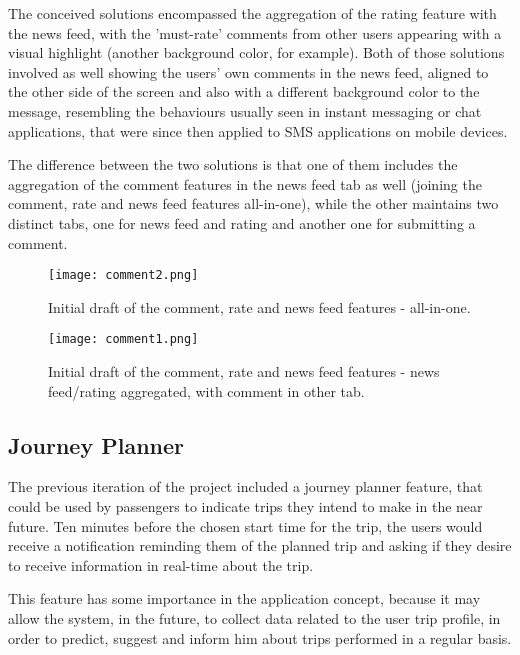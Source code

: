 The conceived solutions encompassed the aggregation of the rating feature with the news feed, with the 'must-rate' comments from other users appearing with a visual highlight (another background color, for example).
Both of those solutions involved as well showing the users' own comments in the news feed, aligned to the other side of the screen and also with a different background color to the message, resembling the behaviours usually seen in instant messaging or chat applications, that were since then applied to SMS applications on mobile devices.

The difference between the two solutions is that one of them includes the aggregation of the comment features in the news feed tab as well (joining the comment, rate and news feed features all-in-one), while the other maintains two distinct tabs, one for news feed and rating and another one for submitting a comment.

\begin{figure}[h!]
  \begin{center}
    \leavevmode
    \texttt{[image: comment2.png]}
    \caption{Initial draft of the comment, rate and news feed features - all-in-one.}
    \label{fig:comment2}
  \end{center}
\end{figure}

\begin{figure}[h!]
  \begin{center}
    \leavevmode
    \texttt{[image: comment1.png]}
    \caption{Initial draft of the comment, rate and news feed features - news feed/rating aggregated, with comment in other tab.}
    \label{fig:comment1}
  \end{center}
\end{figure}

\subsection{Journey Planner}

The previous iteration of the project included a journey planner feature, that could be used by passengers to indicate trips they intend to make in the near future. Ten minutes before the chosen start time for the trip, the users would receive a notification reminding them of the planned trip and asking if they desire to receive information in real-time about the trip.

This feature has some importance in the application concept, because it may allow the system, in the future, to collect data related to the user trip profile, in order to predict, suggest and inform him about trips performed in a regular basis.

